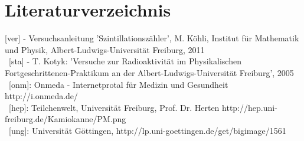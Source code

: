 \clearpage
\section{Literaturverzeichnis}
[ver] - Versuchsanleitung 'Szintillationszähler', M. Köhli, Institut für Mathematik und Physik, Albert-Ludwigs-Universität Freiburg, 2011\\
~[sta] - T. Kotyk: 'Versuche zur Radioaktivität im Physikalischen Fortgeschrittenen-Praktikum an der Albert-Ludwigs-Universität Freiburg', 2005\\ 
~[onm]: Onmeda - Internetprotal für Medizin und Gesundheit http://i.onmeda.de/\\
~[hep]: Teilchenwelt, Universität Freiburg, Prof. Dr. Herten http://hep.uni-freiburg.de/Kamiokanne/PM.png\\
~[ung]: Universität Göttingen, http://lp.uni-goettingen.de/get/bigimage/1561